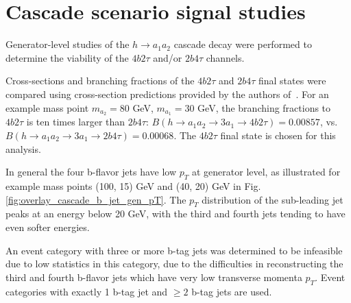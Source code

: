 \section{Cascade scenario signal studies}
\label{section:a1a2_gen_studies}
Generator-level studies of the $h\rightarrow a_1 a_2$ cascade decay were performed to determine the viability of the $4b2\tau$ and/or $2b4\tau$ channels. 

Cross-sections and branching fractions of the $4b2\tau$ and $2b4\tau$ final states were compared using cross-section predictions provided by the authors of~\cite{Robens:2019kga}. For an example mass point $m_{a_2} = 80$ GeV, $m_{a_1} = 30$ GeV, the branching fractions to $4b2\tau$ is ten times larger than $2b4\tau$: $B(h \rightarrow a_1 a_2 \rightarrow 3 a_1 \rightarrow 4b2\tau) = 0.00857$, vs. $B(h \rightarrow a_1 a_2 \rightarrow 3 a_1 \rightarrow 2b4\tau) = 0.00068$. The $4b2\tau$ final state is chosen for this analysis.

In general the four b-flavor jets have low $p_{T}$ at generator level, as illustrated for example mass points (100, 15) GeV and (40, 20) GeV in Fig. \ref{fig:overlay_cascade_b_jet_gen_pT}. The $p_{T}$ distribution of the sub-leading jet peaks at an energy below 20 GeV, with the third and fourth jets tending to have even softer energies.

An event category with three or more b-tag jets was determined to be infeasible due to low statistics in this category, due to the difficulties in reconstructing the third and fourth b-flavor jets which have very low transverse momenta $p_{T}$. Event categories with exactly 1 b-tag jet and $\geq 2$ b-tag jets are used.

